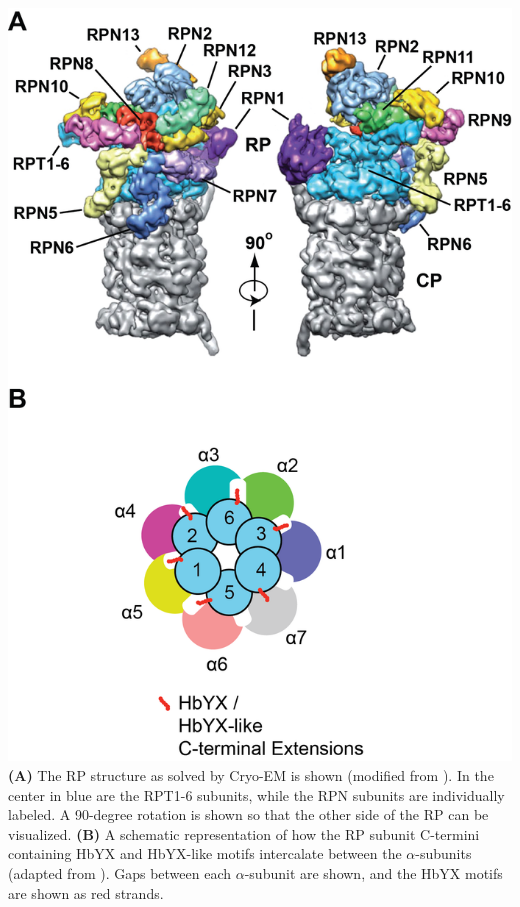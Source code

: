 \begin{FPfigure}
	\centering
	\includegraphics[width=\columnwidth]{intro/rpdetails.png}
	{\textbf{(A)} The RP structure as solved by Cryo-EM is shown (modified from \citep{lander12}). In the center in blue are the RPT1-6 subunits, while the RPN subunits are individually labeled. A 90-degree rotation is shown so that the other side of the RP can be visualized. \textbf{(B)} A schematic representation of how the RP subunit C-termini containing HbYX and HbYX-like motifs intercalate between the $\alpha$-subunits (adapted from \citep{sokolova15}). Gaps between each $\alpha$-subunit are shown, and the HbYX motifs are shown as red strands.}
	\label{fig:rpdetails}
\end{FPfigure}

